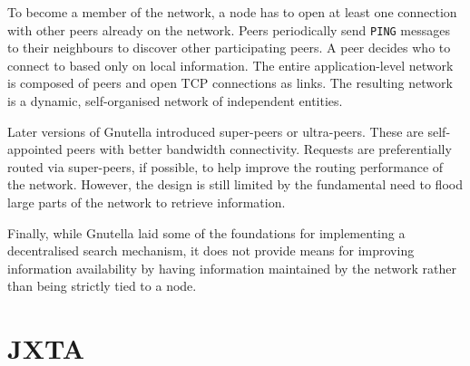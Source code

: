 
To become a member of the network, a node has to open at least one connection with other peers already on the network. Peers periodically send \verb+PING+ messages to their neighbours to discover other participating peers. A peer decides who to connect to based only on local information. The entire application-level network is composed of peers and open TCP connections as links. The resulting network is a dynamic, self-organised network of independent entities.

Later versions of Gnutella introduced super-peers or ultra-peers\cite{rasti2005long}. These are self-appointed peers with better bandwidth connectivity. Requests are preferentially routed via super-peers, if possible, to help improve the routing performance of the network. However, the design is still limited by the fundamental need to flood large parts of the network to retrieve information.

Finally, while Gnutella laid some of the foundations for implementing a decentralised search mechanism, it does not provide means for improving information availability by having information maintained by the network rather than being strictly tied to a node.



\section{JXTA}
\label{sec:jxta}

